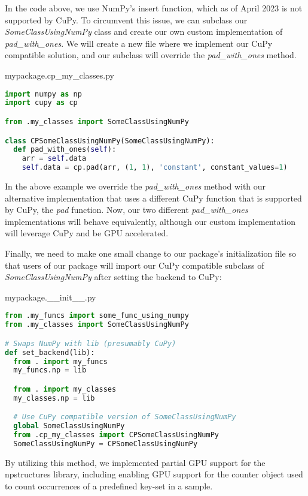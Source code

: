 In the code above, we use NumPy's insert function, which as of April 2023 is not supported by CuPy.
To circumvent this issue, we can subclass our \textit{SomeClassUsingNumPy} class and create our own custom implementation of \textit{pad\_with\_ones}.
We will create a new file where we implement our CuPy compatible solution, and our subclass will override the \textit{pad\_with\_ones} method.
\begin{center}
mypackage.cp\_my\_classes.py
\end{center}
\begin{lstlisting}[language=Python,style=pycode]
import numpy as np
import cupy as cp

from .my_classes import SomeClassUsingNumPy

class CPSomeClassUsingNumPy(SomeClassUsingNumPy):
  def pad_with_ones(self):
    arr = self.data
    self.data = cp.pad(arr, (1, 1), 'constant', constant_values=1)
\end{lstlisting}

In the above example we override the \textit{pad\_with\_ones} method with our alternative implementation that uses a different CuPy function that is supported by CuPy, the \textit{pad} function.
Now, our two different \textit{pad\_with\_ones} implementations will behave equivalently, although our custom implementation will leverage CuPy and be GPU accelerated.

Finally, we need to make one small change to our package's initialization file so that users of our package will import our CuPy compatible subclass of \textit{SomeClassUsingNumPy} after setting the backend to CuPy:
\begin{center}
mypackage.\_\_init\_\_.py
\end{center}
\begin{lstlisting}[language=Python,style=pycode]
from .my_funcs import some_func_using_numpy
from .my_classes import SomeClassUsingNumPy 

# Swaps NumPy with lib (presumably CuPy)
def set_backend(lib):
  from . import my_funcs
  my_funcs.np = lib

  from . import my_classes
  my_classes.np = lib

  # Use CuPy compatible version of SomeClassUsingNumPy
  global SomeClassUsingNumPy
  from .cp_my_classes import CPSomeClassUsingNumPy
  SomeClassUsingNumPy = CPSomeClassUsingNumPy
\end{lstlisting}

By utilizing this method, we implemented partial GPU support for the npstructures library, including enabling GPU support for the counter object used to count occurrences of a predefined key-set in a sample.

